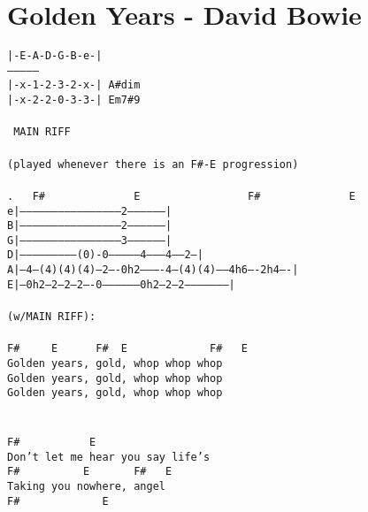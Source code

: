 \newpage
\section{Golden Years - David Bowie}
\label{Golden Years - David Bowie}
\texttt{|-E-A-D-G-B-e-|\\
---------------\\
|-x-1-2-3-2-x-|  A\#dim\\
|-x-2-2-0-3-3-|  Em7\#9\\
\\
\lbrack\ MAIN\ RIFF\rbrack\\
\\
(played\ whenever\ there\ is\ an\ F\#-E\ progression)\\
\\
.\ \ \ F\#\ \ \ \ \ \ \ \ \ \ \ \ \ \ E\ \ \ \ \ \ \ \ \ \ \ \ \ \ \ \ \ F\#\ \ \ \ \ \ \ \ \ \ \ \ \ \ E\\
e|-----------------------------------------------2------------------|\\
B|-----------------------------------------------2------------------|\\
G|-----------------------------------------------3------------------|\\
D|---------------------------(0)-0---------------4--------4------2--|\\
A|--4---(4)(4)(4)---2----0h2----------4---(4)(4)------4h6----2h4----|\\
E|--0h2--2--2--2----0-----------------0h2--2--2---------------------|\\
\\
(w/MAIN\ RIFF):\\
\\
F\#\ \ \ \ \ E\ \ \ \ \ \ F\#\ \ E\ \ \ \ \ \ \ \ \ \ \ \ \ F\#\ \ \ E\\
Golden\ years,\ gold,\ whop\ whop\ whop\\
Golden\ years,\ gold,\ whop\ whop\ whop\\
Golden\ years,\ gold,\ whop\ whop\ whop\\
\\
\\
F\#\ \ \ \ \ \ \ \ \ \ \ E\ \ \ \ \ \ \ \ \ \ \ \ \ \\
Don't\ let\ me\ hear\ you\ say\ life's\ \\
F\#\ \ \ \ \ \ \ \ \ \ E\ \ \ \ \ \ \ F\#\ \ \ E\ \\
Taking\ you\ nowhere,\ angel\\
F\#\ \ \ \ \ \ \ \ \ \ \ \ \ E\\
}

